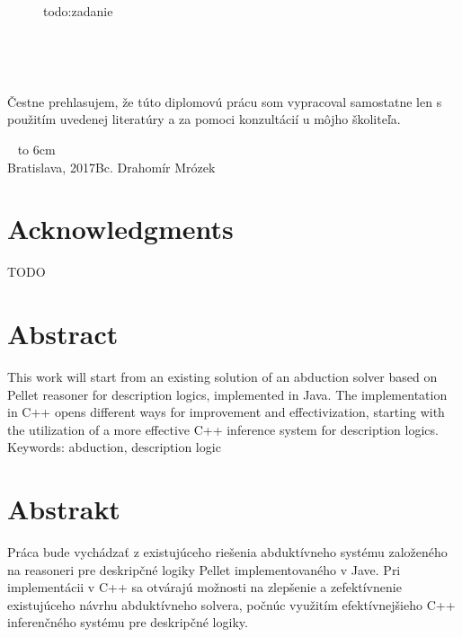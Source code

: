\documentclass[12pt, a4paper, oneside]{book}
\newcommand\mfauthor{Bc. Drahomír Mrózek}
\newcommand\mfplacedate{Bratislava, 2017}
\begin{document}
\thispagestyle{empty}


\begin{figure}[H]
\begin{center}
todo:zadanie
\label{img:zadanie}
\end{center}
\end{figure}

{~}\vspace{12cm}

\noindent
\begin{minipage}{0.25\textwidth}~\end{minipage}
\begin{minipage}{0.75\textwidth}
Čestne prehlasujem, že túto diplomovú prácu som vypracoval samostatne len s použitím uvedenej literatúry a za pomoci konzultácií u môjho školiteľa.
\newline \newline
\end{minipage}
\vfill
~ \hfill {\hbox to 6cm{\dotfill}} \\
\mfplacedate \hfill \mfauthor
\vfill\eject 

\chapter*{Acknowledgments}\label{chap:thank_you}
TODO
\vfill\eject 
\chapter*{Abstract}\label{chap:abstract_en}
This work will start from an existing solution of an abduction solver based on Pellet reasoner for description logics, implemented in Java. The implementation in C++ opens different ways for improvement and effectivization, starting with the utilization of a more effective C++ inference system for description logics.
~\\
Keywords: abduction, description logic
\vfill\eject 
\chapter*{Abstrakt}\label{chap:abstract_sk}
Práca bude vychádzať z existujúceho riešenia abduktívneho systému založeného na reasoneri pre deskripčné logiky Pellet implementovaného v Jave. Pri implementácii v C++ sa otvárajú možnosti na zlepšenie a zefektívnenie existujúceho návrhu abduktívneho solvera, počnúc využitím efektívnejšieho C++ inferenčného systému pre deskripčné logiky.
\end{document}
